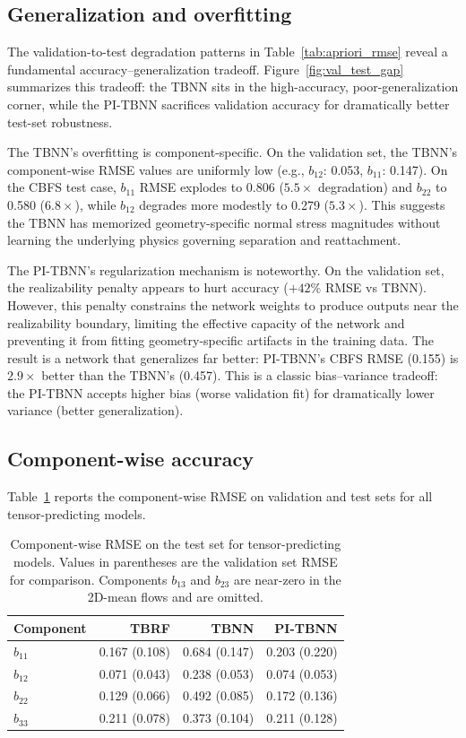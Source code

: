 \subsection{Generalization and overfitting}
\label{sec:generalization}

The validation-to-test degradation patterns in Table~\ref{tab:apriori_rmse} reveal a fundamental accuracy--generalization tradeoff.
Figure~\ref{fig:val_test_gap} summarizes this tradeoff: the TBNN sits in the high-accuracy, poor-generalization corner, while the PI-TBNN sacrifices validation accuracy for dramatically better test-set robustness.

The TBNN's overfitting is component-specific.
On the validation set, the TBNN's component-wise RMSE values are uniformly low (e.g., $b_{12}$: 0.053, $b_{11}$: 0.147).
On the CBFS test case, $b_{11}$ RMSE explodes to 0.806 ($5.5\times$ degradation) and $b_{22}$ to 0.580 ($6.8\times$), while $b_{12}$ degrades more modestly to 0.279 ($5.3\times$).
This suggests the TBNN has memorized geometry-specific normal stress magnitudes without learning the underlying physics governing separation and reattachment.

The PI-TBNN's regularization mechanism is noteworthy.
On the validation set, the realizability penalty appears to hurt accuracy ($+42\%$ RMSE vs TBNN).
However, this penalty constrains the network weights to produce outputs near the realizability boundary, limiting the effective capacity of the network and preventing it from fitting geometry-specific artifacts in the training data.
The result is a network that generalizes far better: PI-TBNN's CBFS RMSE (0.155) is $2.9\times$ better than the TBNN's (0.457).
This is a classic bias--variance tradeoff: the PI-TBNN accepts higher bias (worse validation fit) for dramatically lower variance (better generalization).

\subsection{Component-wise accuracy}

Table~\ref{tab:component_rmse} reports the component-wise RMSE on validation and test sets for all tensor-predicting models.

\begin{table}[htbp]
\centering
\caption{Component-wise RMSE on the test set for tensor-predicting models. Values in parentheses are the validation set RMSE for comparison. Components $b_{13}$ and $b_{23}$ are near-zero in the 2D-mean flows and are omitted.}
\label{tab:component_rmse}
\begin{tabular}{lrrr}
\toprule
Component & TBRF & TBNN & PI-TBNN \\
\midrule
$b_{11}$ & 0.167 (0.108) & 0.684 (0.147) & 0.203 (0.220) \\
$b_{12}$ & 0.071 (0.043) & 0.238 (0.053) & 0.074 (0.053) \\
$b_{22}$ & 0.129 (0.066) & 0.492 (0.085) & 0.172 (0.136) \\
$b_{33}$ & 0.211 (0.078) & 0.373 (0.104) & 0.211 (0.128) \\
\bottomrule
\end{tabular}
\end{table}

